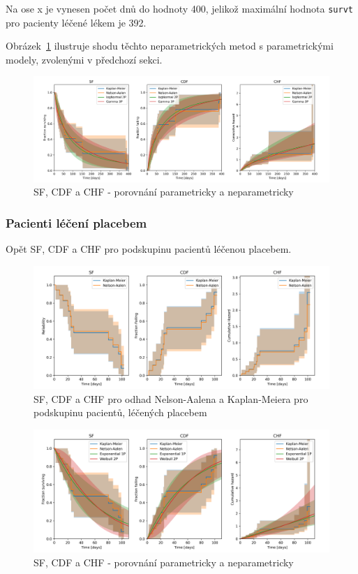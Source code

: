 \documentclass[a4, 11pt]{article}
\theoremstyle{definition}
\theoremstyle{remark}
\begin{document}
    Na ose x je vynesen počet dnů do hodnoty 400, jelikož maximální hodnota \texttt{survt} pro pacienty léčené lékem je 392.
    
    Obrázek~\ref{fig:four_men_drugs_compared_to_parametrics} ilustruje shodu těchto neparametrických metod s parametrickými modely, zvolenými v předchozí sekci.
    
	\begin{figure}[H]
        \centering
        \includegraphics[width=0.9\linewidth]{img/four_men_drugs_compared_to_parametrics.png}
        \caption{SF, CDF a CHF - porovnání parametricky a neparametricky}
        \label{fig:four_men_drugs_compared_to_parametrics}
    \end{figure}

	
	\subsubsection{Pacienti léčení placebem} \label{sec:non_parametric_placebo}
	Opět SF, CDF a CHF pro podskupinu pacientů léčenou placebem.
    
	\begin{figure}[H]
		\centering
		\includegraphics[width=0.9\linewidth]{img/four_men_placebo.png}
		\caption{SF, CDF a CHF pro odhad Nelson-Aalena a Kaplan-Meiera pro podskupinu pacientů, léčených placebem}
		\label{fig:four_men_placebo}
	\end{figure}

	\begin{figure}[H]
    	\centering
    	\includegraphics[width=0.9\linewidth]{img/four_men_placebo_compared_to_parametrics.png}
    	\caption{SF, CDF a CHF - porovnání parametricky a neparametricky}
    	\label{fig:four_men_placebo_comp_to_parametrics}
    \end{figure}
	
\end{document}
